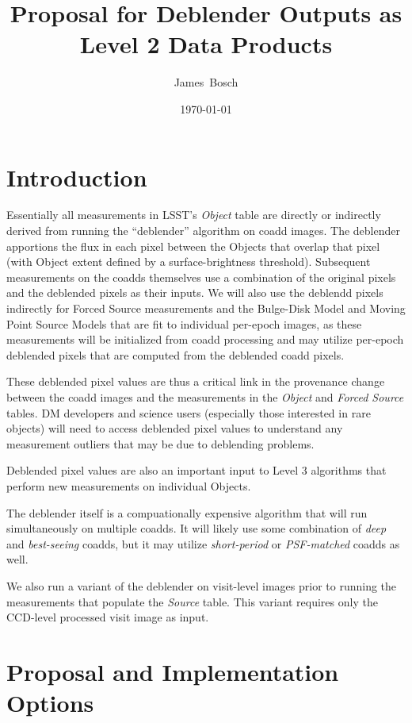 \documentclass[DM,lsstdraft,toc]{lsstdoc}
\title[Deblender Data Products]{Proposal for Deblender Outputs as Level 2 Data Products}
\author{
James~Bosch
}
\date{\today}
\begin{document}
\maketitle

\section{Introduction}

Essentially all measurements in LSST's \emph{Object} table \citep{LSE-163} are directly or indirectly derived from running the ``deblender'' algorithm on coadd images.  The deblender apportions the flux in each pixel between the Objects that overlap that pixel (with Object extent defined by a surface-brightness threshold).  Subsequent measurements on the coadds themselves use a combination of the original pixels and the deblended pixels as their inputs.  We will also use the deblendd pixels indirectly for Forced Source measurements and the Bulge-Disk Model and Moving Point Source Models that are fit to individual per-epoch images, as these measurements will be initialized from coadd processing and may utilize per-epoch deblended pixels that are computed from the deblended coadd pixels.

These deblended pixel values are thus a critical link in the provenance change between the coadd images and the measurements in the \emph{Object} and \emph{Forced Source} tables.  DM developers and science users (especially those interested in rare objects) will need to access deblended pixel values to understand any measurement outliers that may be due to deblending problems.

Deblended pixel values are also an important input to Level 3 algorithms that perform new measurements on individual Objects.

The deblender itself is a compuationally expensive algorithm that will run simultaneously on multiple coadds.  It will likely use some combination of \emph{deep} and \emph{best-seeing} coadds, but it may utilize \emph{short-period} or \emph{PSF-matched} coadds as well.

We also run a variant of the deblender on visit-level images prior to running the measurements that populate the \emph{Source} table.  This variant requires only the CCD-level processed visit image as input.

\section{Proposal and Implementation Options}
\end{document}
